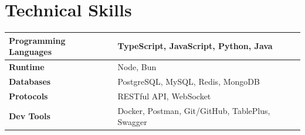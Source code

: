 \section{Technical Skills}

\renewcommand{\arraystretch}{1.35}
\begin{tabularx}{\textwidth}{>{\raggedright\arraybackslash\bfseries}p{4.1cm}X}
\hline
Programming Languages & TypeScript, JavaScript, Python, Java \\
\hline
Runtime & Node, Bun \\
\hline
Databases & PostgreSQL, MySQL, Redis, MongoDB \\
\hline
Protocols & RESTful API, WebSocket \\
\hline
Dev Tools & Docker, Postman, Git/GitHub, TablePlus, Swagger \\
\hline
\end{tabularx}
